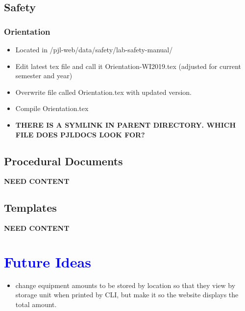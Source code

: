 \documentclass[justified]{LabArx3_5_1}
\begin{document}
\section{Safety}

\subsection{Orientation}
\begin{itemize}
\item Located in /pjl-web/data/safety/lab-safety-manual/
\item Edit latest tex file and call it Orientation-WI2019.tex (adjusted for current semester and year)
\item Overwrite file called Orientation.tex with updated version. 
\item Compile Orientation.tex
\item {\bf THERE IS A SYMLINK IN PARENT DIRECTORY. WHICH FILE DOES PJLDOCS LOOK FOR?}
\end{itemize}

\section{Procedural Documents}

{\bf NEED CONTENT}

\section{Templates}

{\bf NEED CONTENT}

\chapter{\textcolor{blue}{Future Ideas}}
\begin{itemize}
\item change equipment amounts to be stored by location so that they view by storage unit when printed by CLI, but make it so the website displays the total amount.
\end{itemize}
\end{document}

